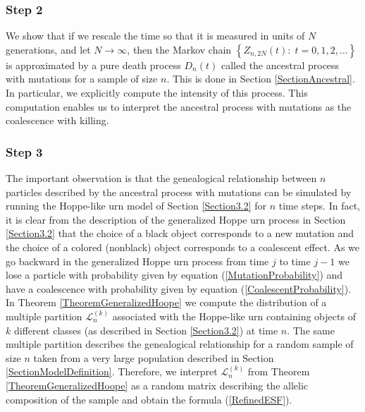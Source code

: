 \documentclass[12pt]{amsart}
\theoremstyle{definition}
\numberwithin{equation}{section}
\begin{document}
\subsubsection{Step 2}We show that if we rescale the time so that it is measured in units of $N$ generations, and let $N\longrightarrow\infty$, then the Markov chain $\left\{Z_{n,2N}(t):\; t=0,1,2,\ldots\right\}$
is approximated by a pure death process $D_n(t)$ called the ancestral process with mutations for a sample of size $n$. This is done in Section
\ref{SectionAncestral}. In particular, we explicitly compute
the intensity of this process. This computation enables us to interpret
the ancestral process with mutations as the coalescence with killing.
\subsubsection{Step 3} The important observation is that the genealogical relationship between $n$ particles described by the ancestral process with mutations can be simulated by running the Hoppe-like urn model of Section \ref{Section3.2}  for $n$ time steps.
In fact, it is clear from the description of the generalized Hoppe urn process in Section \ref{Section3.2} that the choice of a black object corresponds to a new mutation and the choice of a colored (nonblack) object corresponds to a coalescent effect. As we go backward in the generalized Hoppe urn process from time
$j$ to time $j-1$ we lose a particle with probability given by equation
(\ref{MutationProbability}) and have a coalescence with probability given by equation (\ref{CoalescentProbability}).
In Theorem \ref{TheoremGeneralizedHoope} we compute the distribution of a multiple partition $\mathcal{L}_n^{(k)}$ associated with the Hoppe-like
urn containing objects of $k$ different classes (as described in Section \ref{Section3.2}) at time $n$. The same multiple partition describes the genealogical relationship for a random sample of size $n$ taken from a very large population described in Section \ref{SectionModelDefinition}. Therefore, we interpret $\mathcal{L}_n^{(k)}$ from Theorem \ref{TheoremGeneralizedHoope} as a random matrix describing the allelic composition of the sample and obtain the formula (\ref{RefinedESF}).






\end{document}
